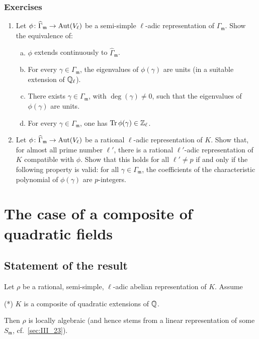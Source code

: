 \subsubsection*{Exercises}
\begin{enumerate}[1)]
\item Let $\phi\colon \widehat{\Gamma}_{\mathfrak{m}} \to \operatorname{Aut}(V_\ell)$ be a
	semi-simple $\ell$-adic representation of $\Gamma_{\mathfrak{m}}$. Show
	the equivalence of:
	\begin{enumerate}[(a)]
	\item $\phi$ extends continuously to $\widehat{\Gamma}_{\mathfrak{m}}$.
	\item For every $\gamma \in \Gamma_{\mathfrak{m}}$, the eigenvalues of
		$\phi(\gamma)$ are units (in a suitable extension of
		$\mathbb{Q}_\ell$).
	\item There exists $\gamma \in \Gamma_{\mathfrak{m}}$, with
		$\deg(\gamma) \ne 0$, such that the eigenvalues of
		$\phi(\gamma)$ are units.
	\item For every $\gamma \in \Gamma_{\mathfrak{m}}$, one has
		$\operatorname{Tr}\phi(\gamma) \in \mathbb{Z}_\ell$.
	\end{enumerate}

\item Let $\phi\colon \widehat{\Gamma}_{\mathfrak{m}} \to \operatorname{Aut}(V_\ell)$ be a
	rational $\ell$-adic representation of $K$.  Show that, for almost all
	prime number $\ell'$, there is a rational $\ell'$-adic representation
	of $K$ compatible with $\phi$. Show that this holds for all $\ell' \ne
	p$ if and only if the following property is valid: for all $\gamma \in
	\Gamma_{\mathfrak{m}}$, the coefficients of the characteristic
	polynomial of $\phi(\gamma)$ are $p$-integers.
\end{enumerate}

\section{The case of a composite of quadratic fields}
\label{sec:III_3}
\dpage

\subsection{Statement of the result}
\label{sec:III_31}

\begin{thm}
Let $\rho$ be a rational, semi-simple, $\ell$-adic abelian representation of
$K$. Assume

\begin{center}
	\textnormal{(*)} $K$ is a composite of quadratic extensions of $\mathbb{Q}$.
\end{center}
%

Then $\rho$ is locally algebraic (and hence stems from a linear representation
of some $S_\mathfrak{m}$, cf.\ \ref{sec:III_23}).
\end{thm}

